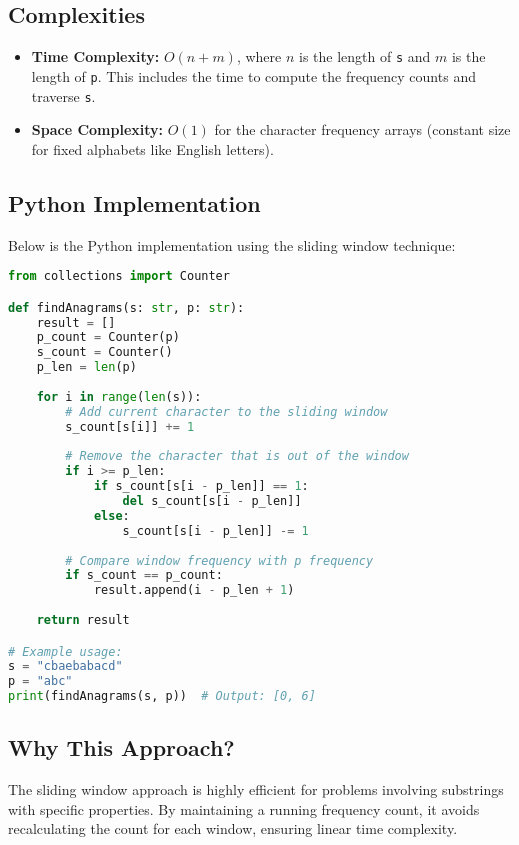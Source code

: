 \subsection*{Complexities}
\begin{itemize}
    \item \textbf{Time Complexity:} \(O(n + m)\), where \(n\) is the length of \texttt{s} and \(m\) is the length of \texttt{p}. This includes the time to compute the frequency counts and traverse \texttt{s}.
    \item \textbf{Space Complexity:} \(O(1)\) for the character frequency arrays (constant size for fixed alphabets like English letters).
\end{itemize}

\subsection*{Python Implementation}
Below is the Python implementation using the sliding window technique:

\begin{fullwidth}
\begin{lstlisting}[language=Python]
from collections import Counter

def findAnagrams(s: str, p: str):
    result = []
    p_count = Counter(p)
    s_count = Counter()
    p_len = len(p)
    
    for i in range(len(s)):
        # Add current character to the sliding window
        s_count[s[i]] += 1
        
        # Remove the character that is out of the window
        if i >= p_len:
            if s_count[s[i - p_len]] == 1:
                del s_count[s[i - p_len]]
            else:
                s_count[s[i - p_len]] -= 1
        
        # Compare window frequency with p frequency
        if s_count == p_count:
            result.append(i - p_len + 1)
    
    return result

# Example usage:
s = "cbaebabacd"
p = "abc"
print(findAnagrams(s, p))  # Output: [0, 6]
\end{lstlisting}
\end{fullwidth}

\subsection*{Why This Approach?}
The sliding window approach is highly efficient for problems involving substrings with specific properties. By maintaining a running frequency count, it avoids recalculating the count for each window, ensuring linear time complexity.

